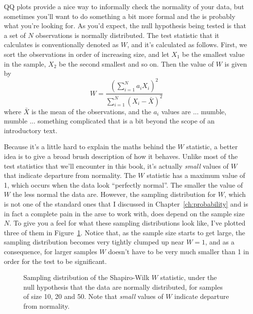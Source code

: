 
QQ plots provide a nice way to informally check the normality of your data, but sometimes you'll want to do something a bit more formal and the  \parencite{Shapiro1965} is probably what you're looking for. As you'd expect, the null hypothesis being tested is that a set of $N$ observations is normally distributed. The test statistic that it calculates is conventionally denoted as $W$, and it's calculated as follows. First, we sort the observations in order of increasing size, and let $X_1$ be the smallest value in the sample, $X_2$ be the second smallest and so on. Then the value of $W$ is given by
$$
W = \frac{ \left( \sum_{i = 1}^N a_i X_i \right)^2 }{ \sum_{i = 1}^N (X_i - \bar{X})^2}
$$
where $\bar{X}$ is the mean of the observations, and the $a_i$ values are ... mumble, mumble ... something complicated that is a bit beyond the scope of an introductory text. 

Because it's a little hard to explain the maths behind the $W$ statistic, a better idea is to give a broad brush description of how it behaves. Unlike most of the test statistics that we'll encounter in this book, it's actually {\it small} values of $W$ that indicate departure from normality. The $W$ statistic has a maximum value of 1, which occurs when the data look ``perfectly normal''. The smaller the value of $W$ the less normal the data are. However, the sampling distribution for $W$, which is not one of the standard ones that I discussed in Chapter~\ref{ch:probability} and is in fact a complete pain in the arse to work with, does depend on the sample size $N$. To give you a feel for what these sampling distributions look like, I've plotted three of them in Figure~\ref{fig:swdist}. Notice that, as the sample size starts to get large, the sampling distribution becomes very tightly clumped up near $W=1$, and as a consequence, for larger samples $W$ doesn't have to be very much smaller than 1 in order for the test to be significant. 

\begin{figure}
\begin{center}
\caption{Sampling distribution of the Shapiro-Wilk $W$ statistic, under the null hypothesis that the data are normally distributed, for samples of size 10, 20 and 50. Note that {\it small} values of $W$ indicate departure from normality.}
\HR
\label{fig:swdist}
\end{center}
\end{figure}

